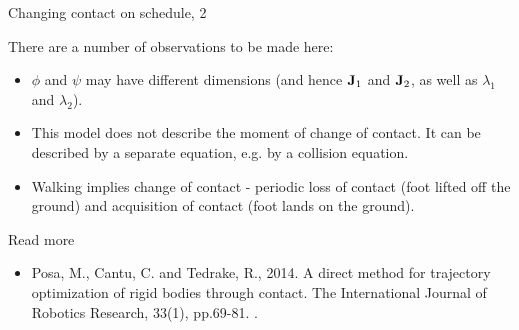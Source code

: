 \documentclass{beamer}
\begin{document}
\begin{frame}{Changing contact on schedule, 2}
	\begin{flushleft}
		
		There are a number of observations to be made here:
		
		\begin{itemize}
			\item $\phi$ and $\psi$ may have different dimensions (and hence $\mathbf{J}_1$ and $\mathbf{J}_2$, as well as $\lambda_1$ and $\lambda_2$).
			
			\item This model does not describe the moment of change of contact. It can be described by a separate equation, e.g. by a collision equation.
			
			\item Walking implies change of contact - periodic loss of contact (foot lifted off the ground) and acquisition of contact (foot lands on the ground).
		\end{itemize}
		
	\end{flushleft}
\end{frame}






\begin{frame}{Read more}
	\begin{itemize}
		\item Posa, M., Cantu, C. and Tedrake, R., 2014. A direct method for trajectory optimization of rigid bodies through contact. The International Journal of Robotics Research, 33(1), pp.69-81. .
		
		 
	\end{itemize}
\end{frame}



\myqrframe
\end{document}
